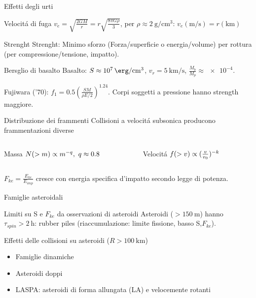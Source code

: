 \begin{wordonframe}{Effetti degli urti}
\begin{block}{Velocit\'a di fuga}
$v_e=\sqrt{\frac{2GM}{r}}=r\sqrt{\frac{8\pi G\rho}{3}}$, per $\rho\approx\SI{2}{\gram\per\cubic\cm}$: $v_e(\si{\meter\per\second})=r(\si{\kilo\meter})$
\end{block}
\begin{block}{Strenght}
Strenght: Minimo sforzo (Forza/superficie o energia/volume) per rottura (per compressione/tensione, impatto).
\end{block}
\begin{block}{Bersglio di basalto}
Basalto: $S\approx\SI{e7}{\erg\per\cubic\cm}$, $v_r=\SI{5}{\kilo\meter\per\second}$, $\frac{M_b}{M_p}\approx\num{e-4}$.
\end{block}
Fujiwara ('70): $f_1=0.5(\frac{SM}{\rho E/2})^{1.24}$.
Corpi soggetti a pressione hanno strength maggiore.
\end{wordonframe}

\begin{frame}{Distribuzione dei frammenti}
Collisioni a velocit\'a subsonica producono frammentazioni diverse
\begin{columns}[T]\begin{column}{0.5\textwidth}
\begin{block}{Massa}
$N(>m)\propto m^{-q},\ q\approx0.8$
\end{block}
\end{column}\begin{column}{0.5\textwidth}
\begin{block}{Velocit\'a}
$f(>v)\propto(\frac{v}{v_0})^{-k}$
\end{block}
\end{column}  \end{columns}
$F_{ke}=\frac{E_{ke}}{E_{imp}}$ cresce con energia specifica d'impatto secondo legge di potenza.
\end{frame}

\begin{frame}{Famiglie asteroidali}
\begin{block}{Limiti su S e $F_{ke}$ da osservazioni di asteroidi}
Asteroidi ($>\SI{150}{\meter}$) hanno $\tau_{spin}>\SI{2}{\hour}$: rubber piles (riaccumulazione: limite fissione, basso S,$F_{ke}$).
\end{block}
\begin{block}{Effetti delle collisioni su asteroidi ($R>\SI{100}{\kilo\meter}$)}
\begin{itemize}\item Famiglie dinamiche \item Asteroidi doppi \item LASPA: asteroidi di forma allungata (LA) e velocemente rotanti\end{itemize}
\end{block}
\end{frame}

